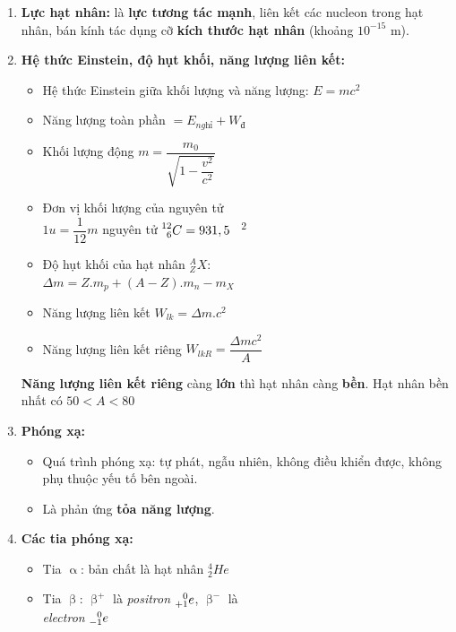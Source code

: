 \documentclass[a4paper,12pt,titlepage,twocolumn]{article}
\newenvironment{myitemize} 
{ \begin{itemize}[leftmargin=*,label=-]  %
		\setlength{\itemsep}{0pt}
		\setlength{\parskip}{0pt}
		\setlength{\parsep}{0pt}     }
{ \end{itemize}                  }
\newenvironment{myenumerate}
{ \begin{enumerate}[label=\textbf{\arabic*}.]
\setlist{nolistsep} %
\setlength{\itemsep}{0pt}
\setlength{\parskip}{0pt}
\setlength{\parsep}{0pt}	}
{ \end{enumerate}}
\begin{document}
\begin{myenumerate}
	\item \textbf{Lực hạt nhân:} là \textbf{lực tương tác mạnh}, liên kết các nucleon trong hạt nhân,
	 bán kính tác dụng cỡ \textbf{kích thước hạt nhân} (khoảng $10^{-15}$ \si{\meter}).
	\item \textbf{Hệ thức Einstein, độ hụt khối, năng lượng liên kết:}
	\begin{myitemize}
		\item Hệ thức Einstein giữa khối lượng và năng lượng: $E=mc^2$ 
		\item Năng lượng toàn phần $=E_{\textit{nghỉ}} + W_{\textit{đ}}$ 
		\item Khối lượng động $m=\dfrac{m_0}{\sqrt{1-\dfrac{v^2}{c^2}}}$ 
		\item Đơn vị khối lượng của nguyên tử \\
		 $1u=\dfrac{1}{12} m$ nguyên tử $\prescript{12}{6}{C}=931,5$ \si[per-mode=symbol]{\mega\eVperc\squared} 
		 \item Độ hụt khối của hạt nhân $^A_ZX$: \\ $\Delta m = Z.m_p + (A-Z).m_n-m_X$
		 \item Năng lượng liên kết $W_{lk} = \Delta m.c^2$
		 \item Năng lượng liên kết riêng $W_{lkR} = \dfrac{\Delta mc^2}{A}$
	\end{myitemize}
	\textbf{Năng lượng liên kết riêng} càng \textbf{lớn} thì hạt nhân càng \textbf{bền}.
	Hạt nhân bền nhất có $50<A<80$
	\item \textbf{Phóng xạ:}
	\begin{myitemize}
		\item Quá trình phóng xạ: tự phát, ngẫu nhiên, không điều khiển được, không phụ thuộc yếu tố bên ngoài.
		\item Là phản ứng \textbf{tỏa năng lượng}.
	\end{myitemize}
	\item \textbf{Các tia phóng xạ:}
	\begin{myitemize}
		\item Tia $\upalpha$: bản chất là hạt nhân $^4_2He$
		\item Tia $\upbeta$: $\upbeta^{+}$ là \textit{positron} $\prescript{0}{+1}{e}$, $\upbeta^{-}$ là \\ \textit{electron} $\prescript{0}{-1}{e}$

\end{myitemize}
\end{myenumerate}
\end{document}
